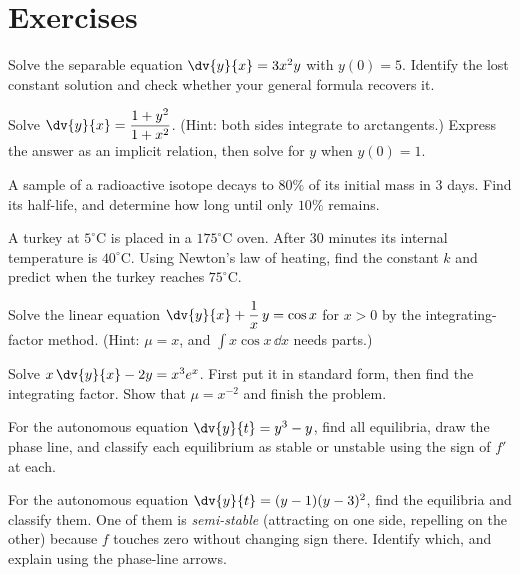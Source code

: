 \section{Exercises}

\begin{exercise}
Solve the separable equation $\dv{y}{x} = 3x^2 y$ with $y(0)=5$. Identify the lost
constant solution and check whether your general formula recovers it.
\end{exercise}

\begin{exercise}
Solve $\dv{y}{x} = \dfrac{1+y^2}{1+x^2}$. (Hint: both sides integrate to arctangents.)
Express the answer as an implicit relation, then solve for $y$ when $y(0)=1$.
\end{exercise}

\begin{exercise}
A sample of a radioactive isotope decays to $80\%$ of its initial mass in $3$ days.
Find its half-life, and determine how long until only $10\%$ remains.
\end{exercise}

\begin{exercise}
A turkey at $5^\circ$C is placed in a $175^\circ$C oven. After $30$ minutes its
internal temperature is $40^\circ$C. Using Newton's law of heating, find the
constant $k$ and predict when the turkey reaches $75^\circ$C.
\end{exercise}

\begin{exercise}
Solve the linear equation $\dv{y}{x} + \dfrac{1}{x}\,y = \cos x$ for $x>0$ by the
integrating-factor method. (Hint: $\mu = x$, and $\int x\cos x\,\dd x$ needs parts.)
\end{exercise}

\begin{exercise}
Solve $x\,\dv{y}{x} - 2y = x^3 e^{x}$. First put it in standard form, then find the
integrating factor. Show that $\mu = x^{-2}$ and finish the problem.
\end{exercise}

\begin{exercise}
For the autonomous equation $\dv{y}{t} = y^3 - y$, find all equilibria, draw the
phase line, and classify each equilibrium as stable or unstable using the sign of
$f'$ at each.
\end{exercise}

\begin{exercise}
For the autonomous equation $\dv{y}{t} = (y-1)(y-3)^2$, find the equilibria and
classify them. One of them is \emph{semi-stable} (attracting on one side, repelling
on the other) because $f$ touches zero without changing sign there. Identify which,
and explain using the phase-line arrows.
\end{exercise}

